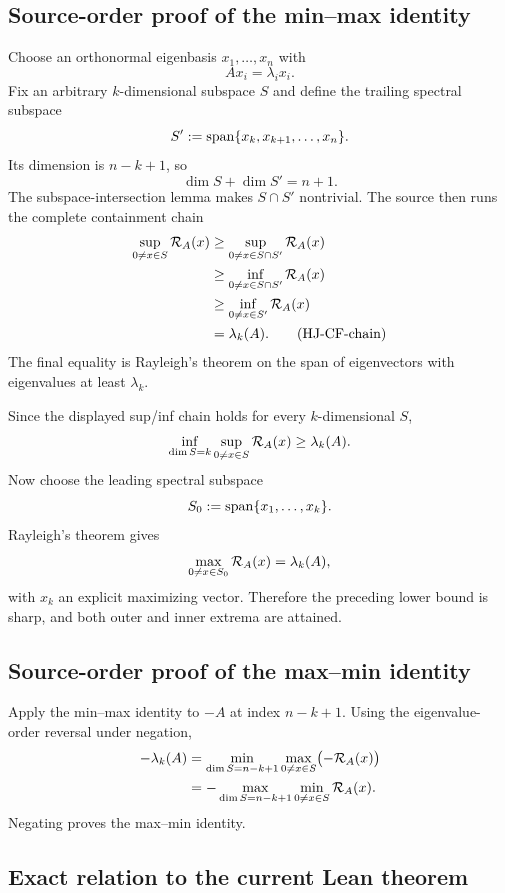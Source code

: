 \subsection{Source-order proof of the min--max identity}

Choose an orthonormal eigenbasis $x_1,\dots,x_n$ with
\[
  Ax_i=\lambda_i x_i.
\]
Fix an arbitrary $k$-dimensional subspace $S$ and define the trailing spectral subspace
\[
  S':=\operatorname{span}\{x_k,x_{k+1},\dots,x_n\}.
\]
Its dimension is $n-k+1$, so
\[
  \dim S+\dim S'=n+1.
\]
The subspace-intersection lemma makes $S\cap S'$ nontrivial. The source then runs the complete containment chain
\begin{align}
  \sup_{0\ne x\in S}\mathcal{R}_{A}(x)
  &\ge \sup_{0\ne x\in S\cap S'}\mathcal{R}_{A}(x) \notag\\
  &\ge \inf_{0\ne x\in S\cap S'}\mathcal{R}_{A}(x) \notag\\
  &\ge \inf_{0\ne x\in S'}\mathcal{R}_{A}(x) \notag\\
  &=\lambda_k(A). \tag{HJ-CF-chain}
\end{align}
The final equality is Rayleigh's theorem on the span of eigenvectors with eigenvalues at least $\lambda_k$.

Since the displayed sup/inf chain holds for every $k$-dimensional $S$,
\[
  \inf_{\dim S=k}\sup_{0\ne x\in S}\mathcal{R}_{A}(x)\ge\lambda_k(A).
\]
Now choose the leading spectral subspace
\[
  S_0:=\operatorname{span}\{x_1,\dots,x_k\}.
\]
Rayleigh's theorem gives
\[
  \max_{0\ne x\in S_0}\mathcal{R}_{A}(x)=\lambda_k(A),
\]
with $x_k$ an explicit maximizing vector. Therefore the preceding lower bound is sharp, and both outer and inner extrema are attained.

\subsection{Source-order proof of the max--min identity}

Apply the min--max identity to $-A$ at index $n-k+1$. Using the eigenvalue-order reversal under negation,
\begin{align*}
  -\lambda_k(A)
  &=\min_{\dim S=n-k+1}\max_{0\ne x\in S}\bigl(-\mathcal{R}_{A}(x)\bigr)\\
  &=-\max_{\dim S=n-k+1}\min_{0\ne x\in S}\mathcal{R}_{A}(x).
\end{align*}
Negating proves the max--min identity.

\subsection{Exact relation to the current Lean theorem}

